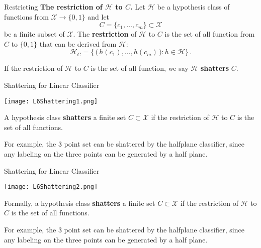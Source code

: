 \documentclass[10pt, table, dvipsnames, handout]{beamer}
\newcommand{\cX}{\ensuremath{\mathcal{X}}}
\newcommand{\cH}{\ensuremath{\mathcal{H}}}
\begin{document}
\begin{frame}[fragile]{Restricting}
\textbf{The restriction of $\cH$ to $C$.} Let $\cH$ be a hypothesis class of functions from $\cX\to \{0,1\}$ and let 
$$
C = \{c_1,\ldots, c_m\}\subset \cX
$$
be a finite subset of $\cX$. \pause The \textbf{restriction} of $\cH$ to $C$ is the set of all function from $C$ to $\{0,1\}$ that can be derived from $\cH$:
$$
\cH_C = \big\{\,\big(\,h(c_1),\ldots,h(c_m)\,\big) : h\in \cH\}\,.
$$\pause

If the restriction of $\cH$ to $C$ is the set of all function, we say $\cH$ \textbf{shatters} $C$. 
\end{frame}





\begin{frame}[fragile]{Shattering for Linear Classifier}
  \begin{minipage}[t][0.6\textheight][t]{\textwidth}
	\centering \texttt{[image: L6Shattering1.png]} 
  \end{minipage}
  \vfill
  \begin{minipage}[t][0.4\textheight][t]{\textwidth}
A hypothesis class \textbf{shatters} a finite set $C\subset\cX$ if the restriction of $\cH$ to $C$ is the set of all functions. \pause

For example, the 3 point set can be shattered by the halfplane classifier, since any labeling on the three points can be generated by a half plane.
\end{minipage}

\end{frame}





\begin{frame}[fragile]{Shattering for Linear Classifier}
  \begin{minipage}[t][0.6\textheight][t]{\textwidth}
	\centering \texttt{[image: L6Shattering2.png]} 
  \end{minipage}
  \vfill
  \begin{minipage}[t][0.4\textheight][t]{\textwidth}
Formally, a hypothesis class \textbf{shatters} a finite set $C\subset\cX$ if the restriction of $\cH$ to $C$ is the set of all functions. 

For example, the 3 point set can be shattered by the halfplane classifier, since any labeling on the three points can be generated by a half plane.
\end{minipage}

\end{frame}
\end{document}
